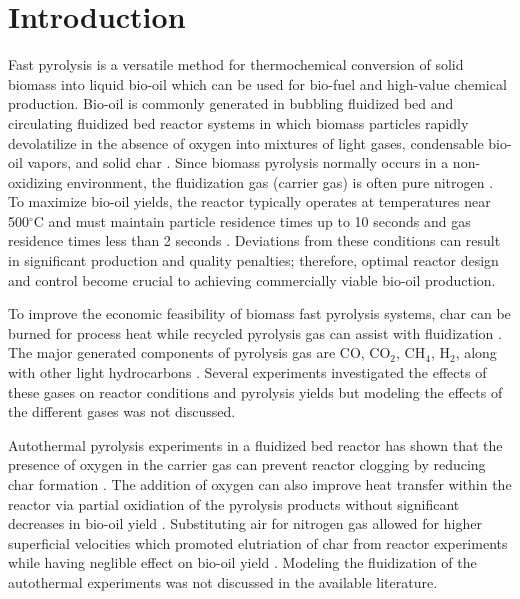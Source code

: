 
\section{Introduction}

Fast pyrolysis is a versatile method for thermochemical conversion of solid biomass into liquid bio-oil which can be used for bio-fuel and high-value chemical production. Bio-oil is commonly generated in bubbling fluidized bed and circulating fluidized bed reactor systems in which biomass particles rapidly devolatilize in the absence of oxygen into mixtures of light gases, condensable bio-oil vapors, and solid char \cite{Bridgwater-1999, Bridgwater-2018a, Mohan-2006}. Since biomass pyrolysis normally occurs in a non-oxidizing environment, the fluidization gas (carrier gas) is often pure nitrogen \cite{Mohan-2006}. To maximize bio-oil yields, the reactor typically operates at temperatures near 500$^\circ$C and must maintain particle residence times up to 10 seconds and gas residence times less than 2 seconds \cite{Bridgwater-2018a}. Deviations from these conditions can result in significant production and quality penalties; therefore, optimal reactor design and control become crucial to achieving commercially viable bio-oil production.

To improve the economic feasibility of biomass fast pyrolysis systems, char can be burned for process heat while recycled pyrolysis gas can assist with fluidization \cite{Bridgwater-1999, Mante-2012}. The major generated components of pyrolysis gas are CO, CO$_2$, CH$_4$, H$_2$, along with other light hydrocarbons \cite{Asadullah-2008, Zhang-2011}. Several experiments investigated the effects of these gases on reactor conditions and pyrolysis yields \cite{Mante-2012, Mullen-2013, Zhang-2011} but modeling the effects of the different gases was not discussed.

Autothermal pyrolysis experiments in a fluidized bed reactor has shown that the presence of oxygen in the carrier gas can prevent reactor clogging by reducing char formation \cite{Kim-2014}. The addition of oxygen can also improve heat transfer within the reactor via partial oxidiation of the pyrolysis products without significant decreases in bio-oil yield \cite{Polin-2019a}. Substituting air for nitrogen gas allowed for higher superficial velocities which promoted elutriation of char from reactor experiments while having neglible effect on bio-oil yield \cite{Polin-2019b}. Modeling the fluidization of the autothermal experiments was not discussed in the available literature.

